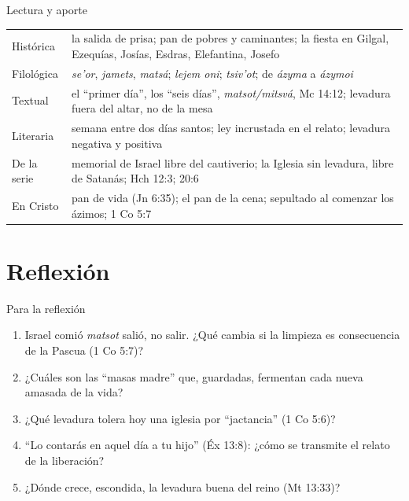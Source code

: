 \begin{frame}{Lectura y aporte}
\scriptsize\renewcommand{\arraystretch}{1.13}
\begin{tabular}{@{}L{2.0cm}L{10.0cm}@{}}
\toprule
Histórica & la salida de prisa; pan de pobres y caminantes; la fiesta en Gilgal, Ezequías, Josías, Esdras, Elefantina, Josefo \\
Filológica & \emph{se'or}, \emph{jamets}, \emph{matsá}; \emph{lejem oni}; \emph{tsiv'ot}; de \emph{ázyma} a \emph{ázymoi} \\
Textual & el ``primer día'', los ``seis días'', \emph{matsot/mitsvá}, Mc 14:12; levadura fuera del altar, no de la mesa \\
Literaria & semana entre dos días santos; ley incrustada en el relato; levadura negativa y positiva \\
De la serie & memorial de Israel libre del cautiverio; la Iglesia sin levadura, libre de Satanás; Hch 12:3; 20:6 \\
En Cristo & pan de vida (Jn 6:35); el pan de la cena; sepultado al comenzar los ázimos; 1 Co 5:7 \\
\bottomrule
\end{tabular}
\end{frame}

\section{Reflexión}

\begin{frame}{Para la reflexión}
\small
\begin{enumerate}
\item Israel comió \emph{matsot}  salió, no  salir. ¿Qué cambia si la limpieza es consecuencia de la Pascua (1 Co 5:7)?
\item ¿Cuáles son las ``masas madre'' que, guardadas, fermentan cada nueva amasada de la vida?
\item ¿Qué levadura tolera hoy una iglesia por ``jactancia'' (1 Co 5:6)?
\item ``Lo contarás en aquel día a tu hijo'' (Éx 13:8): ¿cómo se transmite el relato de la liberación?
\item ¿Dónde crece, escondida, la levadura buena del reino (Mt 13:33)?
\end{enumerate}
\end{frame}

